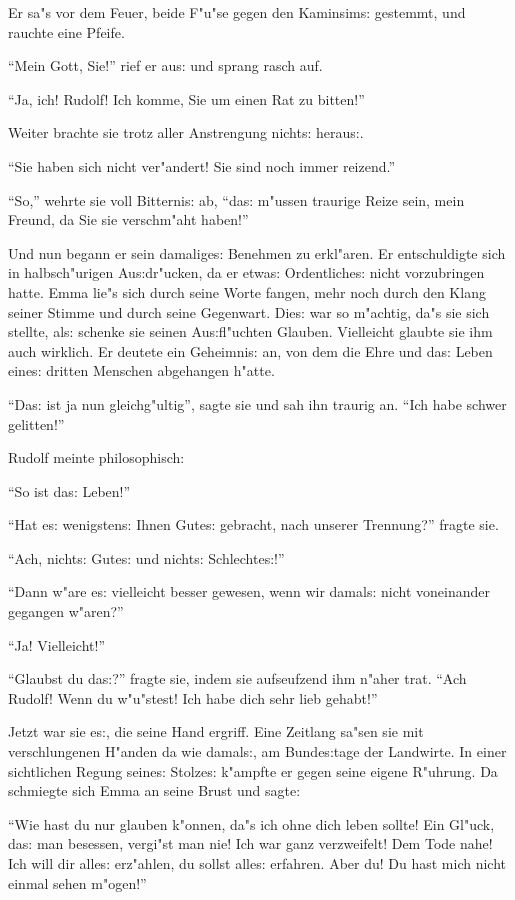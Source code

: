 \documentclass[oneside,12pt]{book}
\newcommand{\s}{s:}%
\begin{document}
Er sa"s vor dem Feuer, beide F"u"se gegen den Kaminsim{\s}
gestemmt, und rauchte eine Pfeife.

"`Mein Gott, Sie!"' rief er au{\s} und sprang rasch auf.

"`Ja, ich! Rudolf! Ich komme, Sie um einen Rat zu bitten!"'

Weiter brachte sie trotz aller Anstrengung nicht{\s} herau{\s}.

"`Sie haben sich nicht ver"andert! Sie sind noch immer reizend."'

"`So,"' wehrte sie voll Bitterni{\s} ab, "`da{\s} m"ussen traurige
Reize sein, mein Freund, da Sie sie verschm"aht haben!"'

Und nun begann er sein damalige{\s} Benehmen zu erkl"aren. Er
entschuldigte sich in halbsch"urigen Au{\s}dr"ucken, da er
etwa{\s} Ordentliche{\s} nicht vorzubringen hatte. Emma lie"s sich
durch seine Worte fangen, mehr noch durch den Klang seiner Stimme
und durch seine Gegenwart. Die{\s} war so m"achtig, da"s sie sich
stellte, al{\s} schenke sie seinen Au{\s}fl"uchten Glauben.
Vielleicht glaubte sie ihm auch wirklich. Er deutete ein
Geheimni{\s} an, von dem die Ehre und da{\s} Leben eine{\s}
dritten Menschen abgehangen h"atte.

"`Da{\s} ist ja nun gleichg"ultig"', sagte sie und sah ihn traurig
an. "`Ich habe schwer gelitten!"'

Rudolf meinte philosophisch:

"`So ist da{\s} Leben!"'

"`Hat e{\s} wenigsten{\s} Ihnen Gute{\s} gebracht, nach unserer
Trennung?"' fragte sie.

"`Ach, nicht{\s} Gute{\s} und nicht{\s} Schlechte{\s}!"'

"`Dann w"are e{\s} vielleicht besser gewesen, wenn wir damal{\s}
nicht voneinander gegangen w"aren?"'

"`Ja! Vielleicht!"'

"`Glaubst du da{\s}?"' fragte sie, indem sie aufseufzend ihm
n"aher trat. "`Ach Rudolf! Wenn du w"u"stest! Ich habe dich sehr
lieb gehabt!"'

Jetzt war sie e{\s}, die seine Hand ergriff. Eine Zeitlang sa"sen
sie mit verschlungenen H"anden da wie damal{\s}, am Bunde{\s}tage
der Landwirte. In einer sichtlichen Regung seine{\s} Stolze{\s}
k"ampfte er gegen seine eigene R"uhrung. Da schmiegte sich Emma an
seine Brust und sagte:

"`Wie hast du nur glauben k"onnen, da"s ich ohne dich leben
sollte! Ein Gl"uck, da{\s} man besessen, vergi"st man nie! Ich war
ganz verzweifelt! Dem Tode nahe! Ich will dir alle{\s} erz"ahlen,
du sollst alle{\s} erfahren. Aber du! Du hast mich nicht einmal
sehen m"ogen!"'
\end{document}
